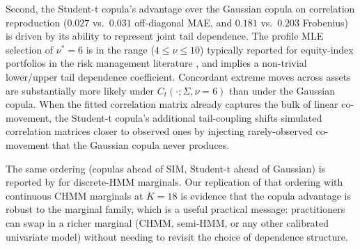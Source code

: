 Second, the Student-t copula's advantage over the Gaussian copula on correlation reproduction ($0.027$ vs.\ $0.031$ off-diagonal MAE, and $0.181$ vs.\ $0.203$ Frobenius) is driven by its ability to represent joint tail dependence.
The profile MLE selection of $\nu^* = 6$ is in the range ($4 \leq \nu \leq 10$) typically reported for equity-index portfolios in the risk management literature \cite{demarta2005tcopula, mcneil2015quantitative}, and implies a non-trivial lower/upper tail dependence coefficient.
Concordant extreme moves across assets are substantially more likely under $C_t(\cdot ; \Sigma, \nu = 6)$ than under the Gaussian copula.
When the fitted correlation matrix already captures the bulk of linear co-movement, the Student-t copula's additional tail-coupling shifts simulated correlation matrices closer to observed ones by injecting rarely-observed co-movement that the Gaussian copula never produces.

The same ordering (copulas ahead of SIM, Student-t ahead of Gaussian) is reported by \citet{alswaidan2026hybrid} for discrete-HMM marginals.
Our replication of that ordering with continuous CHMM marginals at $K = 18$ is evidence that the copula advantage is robust to the marginal family, which is a useful practical message: practitioners can swap in a richer marginal (CHMM, semi-HMM, or any other calibrated univariate model) without needing to revisit the choice of dependence structure.

